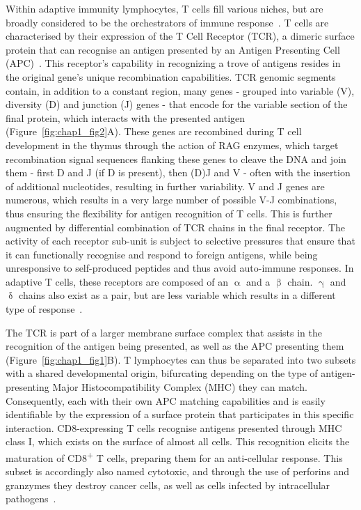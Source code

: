 Within adaptive immunity lymphocytes, T cells fill various niches, but are broadly considered to be the orchestrators of immune response~\citep{kumar_human_2018}. T cells are characterised by their expression of the T Cell Receptor (TCR), a dimeric surface protein that can recognise an antigen presented by an Antigen Presenting Cell (APC)~\citep{reinherz_revisiting_2014}. This receptor's capability in recognizing a trove of antigens resides in the original gene's unique recombination capabilities. TCR genomic segments contain, in addition to a constant region, many genes - grouped into variable (V), diversity (D) and junction (J) genes - that encode for the variable section of the final protein, which interacts with the presented antigen (Figure~\ref{fig:chap1_fig2}A). These genes are recombined during T cell development in the thymus through the action of RAG enzymes, which target recombination signal sequences flanking these genes to cleave the DNA and join them - first D and J (if D is present), then (D)J and V - often with the insertion of additional nucleotides, resulting in further variability. V and J genes are numerous, which results in a very large number of possible V-J combinations, thus ensuring the flexibility for antigen recognition of T cells. This is further augmented by differential combination of TCR chains in the final receptor. The activity of each receptor sub-unit is subject to selective pressures that ensure that it can functionally recognise and respond to foreign antigens, while being unresponsive to self-produced peptides and thus avoid auto-immune responses. In adaptive T cells, these receptors are composed of an ${\upalpha}$ and a ${\upbeta}$ chain. ${\upgamma}$ and ${\updelta}$ chains also exist as a pair, but are less variable which results in a different type of response~\citep{simoes_molecular_2018}.

The TCR is part of a larger membrane surface complex that assists in the recognition of the antigen being presented, as well as the APC presenting them (Figure~\ref{fig:chap1_fig1}B). T lymphocytes can thus be separated into two subsets with a shared developmental origin, bifurcating depending on the type of antigen-presenting Major Histocompatibility Complex (MHC) they can match. Consequently, each with their own APC matching capabilities and is easily identifiable by the expression of a surface protein that participates in this specific interaction. CD8-expressing T cells recognise antigens presented through MHC class I, which exists on the surface of almost all cells. This recognition elicits the maturation of CD8\textsuperscript{+} T cells, preparing them for an anti-cellular response. This subset is accordingly also named cytotoxic, and through the use of perforins and granzymes they destroy cancer cells, as well as cells infected by intracellular pathogens~\citep{halle_mechanisms_2017}.

